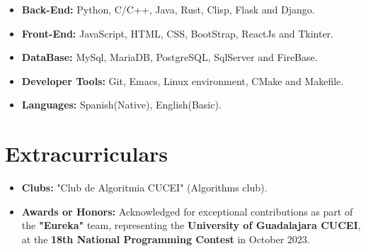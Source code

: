\message{ !name(MyResume.tex)}\documentclass[11pt]{article}
\begin{document}
\begin{itemize}[noitemsep, nolistsep]
\item \textbf{Back-End:} Python, C/C++, Java, Rust, Clisp, Flask and Django.
\item \textbf{Front-End:} JavaScript, HTML, CSS, BootStrap, ReactJs and Tkinter.
\item \textbf{DataBase:} MySql, MariaDB, PostgreSQL, SqlServer and FireBase.
\item \textbf{Developer Tools:} Git, Emacs, Linux environment, CMake and Makefile.
\item \textbf{Languages:} Spanish(Native), English(Basic).
\end{itemize}
\vspace{-0.5cm}

\section*{Extracurriculars}
\vspace{-0.3cm}
\titlerule[0.3pt]
\vspace{0.1cm}
\begin{itemize}[noitemsep, nolistsep]
\item \textbf{Clubs:} "Club de Algoritmia CUCEI" (Algorithms club).
\item \textbf{Awards or Honors:} Acknowledged for exceptional contributions as part of the \textbf{"Eureka"}
  team, representing the \textbf{University of Guadalajara CUCEI}, at the
  \textbf{18th National Programming Contest} in October 2023.
\end{itemize}
\end{document}
